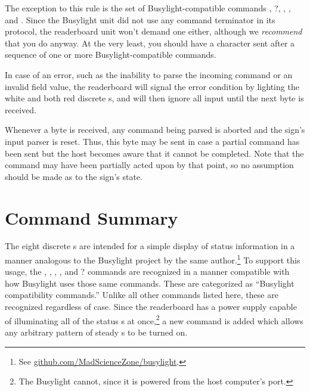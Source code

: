 The exception to this rule is the set of Busylight-compatible commands
\z*,
\z?,
,
,
and
.
Since the Busylight unit did not use any command terminator in its protocol, the readerboard
unit won't demand one either, although we \emph{recommend} that you do anyway. At the very least,
you should have a
character sent after a sequence of one or more Busylight-compatible commands.


In case of an error, such as the inability to parse the incoming command or an invalid
field value, the readerboard will signal the error condition by lighting the white and
both red discrete \led s, and will then ignore all input until the next
 byte is received.

Whenever a  byte is received, any command being parsed is aborted
and the sign's input parser is reset. Thus, this byte may be sent in case a partial command
has been sent but the host becomes aware that it cannot be completed. Note that the command
may have been partially acted upon by that point, so no assumption should be made as to the
sign's state.


\section{Command Summary}
The eight discrete \led s are intended for a simple display of status information
in a manner analogous to the Busylight project by the same author.\footnote{See
\href{https://github.com/MadScienceZone/busylight}{github.com/MadScienceZone/busylight}.}
To support this usage, the , , , \z*, and \z? commands are recognized
in a manner compatible with how Busylight uses those same commands. These are categorized
as ``Busylight compatibility commands.'' Unlike all other commands listed here, these are
recognized regardless of case.  Since the readerboard has a power supply capable of illuminating
all of the status \led s at once,\footnote{The Busylight cannot, since it is powered
from the host computer's  port.} a new command  is added which allows any
arbitrary pattern of steady \led s to be turned on.

